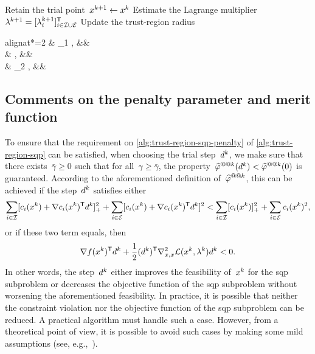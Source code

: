 \begin{algorithm}
{{            Retain the trial point~$\iter[k + 1] \gets \iter[k]$\;
        }
        Estimate the Lagrange multiplier~$\lm[k + 1] = [\lm[k + 1]_i]_{i \in \iub \cup \ieq}^{\T}$\;
        Update the trust-region radius
        \begin{algoempheq}[left={\rad[k + 1] \gets \empheqlbrace}]{alignat*=2}
            & \theta_1 \rad[k],  && \quad {}\\
            & \rad[k],           && \quad {}\\
            & \theta_2 \rad[k],  && \quad {}
        \end{algoempheq}
    }
\end{algorithm}

\subsection{Comments on the penalty parameter and merit function}
\label{subsec:penalty-parameter-merit-function}

To ensure that the requirement on \cref{alg:trust-region-sqp-penalty} of \cref{alg:trust-region-sqp} can be satisfied, when choosing the trial step~$\step[k]$, we make sure that there exists~$\bar{\gamma} \ge 0$ such that for all~$\gamma \ge \bar{\gamma}$, the property~$\meritm[k](\step[k]) < \meritm[k](0)$ is guaranteed.
According to the aforementioned definition of~$\meritm[k]$, this can be achieved if the step~$\step[k]$ satisfies either
\begin{equation*}
    \sum_{i \in \iub} \posp{\con{i}(\iter[k]) + \nabla \con{i}(\iter[k])^{\T} \step[k]}^2 + \sum_{i \in \ieq} [\con{i}(\iter[k]) + \nabla \con{i}(\iter[k])^{\T} \step[k]]^2 < \sum_{i \in \iub} \posp{\con{i}(\iter[k])}^2 + \sum_{i \in \ieq} \con{i}(\iter[k])^2,
\end{equation*}
or if these two term equals, then
\begin{equation*}
    \nabla \obj(\iter[k])^{\T} \step[k] + \frac{1}{2} (\step[k])^{\T} \nabla_{x, x}^2 \lag(\iter[k], \lm[k]) \step[k] < 0.
\end{equation*}
In other words, the step~$\step[k]$ either improves the feasibility of~$\iter[k]$ for the \gls{sqp} subproblem or decreases the objective function of the \gls{sqp} subproblem without worsening the aforementioned feasibility.
In practice, it is possible that neither the constraint violation nor the objective function of the \gls{sqp} subproblem can be reduced.
A practical algorithm must handle such a case.
However, from a theoretical point of view, it is possible to avoid such cases by making some mild assumptions (see, e.g.,~\cite[Asm.~3.1]{Powell_Yuan_1991}).

